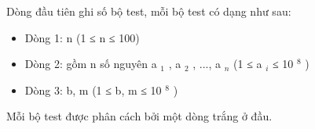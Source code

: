 Dòng đầu tiên ghi số bộ test, mỗi bộ test có dạng như sau:
\begin{itemize}
	\item Dòng 1: n (1 ≤ n ≤ 100)
	\item Dòng 2: gồm n số nguyên a $_ 1 $ , a $_ 2 $ , ..., a $_ n $ (1 ≤ a $_ i $ ≤ 10 $^ 8 $ )
	\item Dòng 3: b, m (1 ≤ b, m ≤ 10 $^ 8 $ )
\end{itemize}

Mỗi bộ test được phân cách bởi một dòng trắng ở đầu.

\
